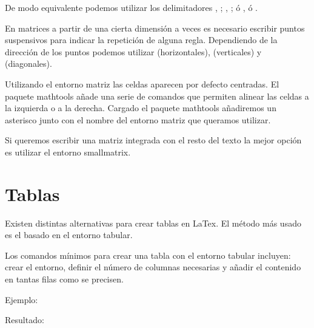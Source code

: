 \documentclass[11pt, a4paper]{article}
\begin{document}


De modo equivalente podemos utilizar los delimitadores \com{left[} , \com{right]};  , ;  ó  ,  ó  .

En matrices a partir de una cierta dimensión a veces es necesario escribir puntos suspensivos para indicar la repetición de alguna regla. Dependiendo de la dirección de los puntos podemos utilizar  (horizontales),  (verticales) y  (diagonales).

Utilizando el entorno matriz las celdas aparecen por defecto centradas. El paquete mathtools añade una serie de comandos que permiten alinear las celdas a la izquierda o a la derecha. Cargado el paquete mathtools añadiremos un asterisco junto con el nombre del entorno matriz que queramos utilizar.

Si queremos escribir una matriz integrada con el resto del texto la mejor opción es utilizar el entorno smallmatrix.

\section{Tablas}
 
Existen distintas alternativas para crear tablas en LaTex. El método más usado es el basado en el entorno tabular.

Los comandos mínimos para crear una tabla con el entorno tabular incluyen: crear el entorno, definir el número de columnas necesarias y añadir el contenido en tantas filas como se precisen.

Ejemplo:






	
Resultado:
	
	
\end{document}
